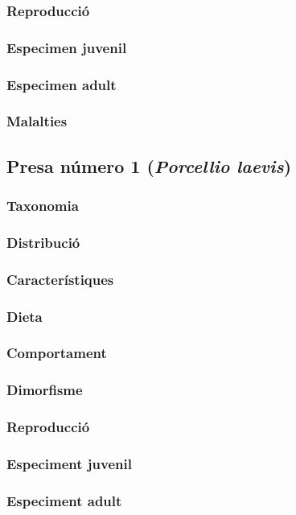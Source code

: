 \subsubsection{Reproducció} 
\subsubsection{Especimen juvenil} 
\subsubsection{Especimen adult} 
\subsubsection{Malalties} 

\subsection{Presa número 1 (\textit{Porcellio laevis})}
\subsubsection{Taxonomia} 
\subsubsection{Distribució} 
\subsubsection{Característiques} 
\subsubsection{Dieta} 
\subsubsection{Comportament} 
\subsubsection{Dimorfisme} 
\subsubsection{Reproducció} 
\subsubsection{Especiment juvenil} 
\subsubsection{Especiment adult} 

